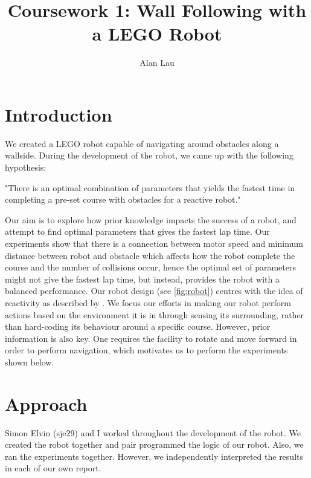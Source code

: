 \documentclass[a4paper,12pt]{article}
\title{Coursework 1:  Wall Following with a LEGO Robot}
\author{Alan Lau}
\begin{document}
\maketitle

\section{Introduction}
We created a LEGO robot capable of navigating around obstacles along a wallside. During the development of the robot, we came up with the following hypothesis:

\begin{center}
    "There is an optimal combination of parameters that yields the fastest time in completing a pre-set course with obstacles for a reactive robot." 
\end{center}

Our aim is to explore how prior knowledge impacts the success of a robot, and attempt to find optimal parameters that gives the fastest lap time. Our experiments show that there is a connection between motor speed and minimum distance between robot and obstacle which affects how the robot complete the course and the number of collisions occur, hence the optimal set of parameters might not give the fastest lap time, but instead, provides the robot with a balanced performance. Our robot design (see \autoref{fig:robot}) centres with the idea of reactivity as described by \cite{brooks1991}. We focus our efforts in making our robot perform actions based on the environment it is in through sensing its surrounding, rather than hard-coding its behaviour around a specific course. However, prior information is also key. One requires the facility to rotate and move forward in order to perform navigation, which motivates us to perform the experiments shown below.


\section{Approach}
Simon Elvin (sje29) and I worked throughout the development of the robot. We created the robot together and pair programmed the logic of our robot. Also, we ran the experiments together. However, we independently interpreted the results in each of our own report.
\end{document}
